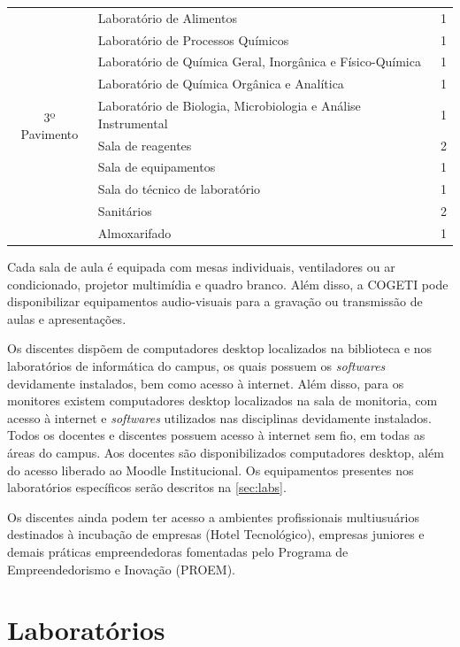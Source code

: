 \begin{table}
\begin{tabularx}{\textwidth}{c >{\centering\arraybackslash}X  c}
        \multirow{10}{*}{ 3º Pavimento } & Laboratório de Alimentos & 1 \\
        & Laboratório de Processos Químicos & 1 \\
        & Laboratório de Química Geral, Inorgânica e Físico-Química & 1 \\
        & Laboratório de Química Orgânica e Analítica & 1 \\
        & Laboratório de Biologia, Microbiologia e Análise Instrumental & 1 \\
        & Sala de reagentes & 2 \\
        & Sala de equipamentos & 1 \\
        & Sala do técnico de laboratório & 1 \\
        & Sanitários & 2 \\
        & Almoxarifado & 1 \\ \bottomrule

        \end{tabularx}
    \label{qua:blocoa}
\end{table}

Cada sala de aula é equipada com mesas individuais, ventiladores ou ar condicionado, projetor multimídia e quadro branco. Além disso, a COGETI pode disponibilizar equipamentos audio-visuais para a gravação ou transmissão de aulas e apresentações.

Os discentes dispõem de computadores desktop localizados na biblioteca e nos laboratórios de informática do campus, os quais possuem os \textit{softwares} devidamente instalados, bem como acesso à internet. Além disso, para os monitores existem computadores desktop localizados na sala de monitoria, com acesso à internet e \textit{softwares} utilizados nas disciplinas devidamente instalados. Todos os docentes e discentes possuem acesso à internet sem fio, em todas as áreas do campus. Aos docentes são disponibilizados computadores desktop, além do acesso liberado ao Moodle Institucional. Os equipamentos presentes nos laboratórios específicos serão descritos na \autoref{sec:labs}.

Os discentes ainda podem ter acesso a ambientes profissionais multiusuários destinados à incubação de empresas (Hotel Tecnológico), empresas juniores e demais práticas empreendedoras fomentadas pelo Programa de Empreendedorismo e Inovação (PROEM).

\section{Laboratórios}
\label{sec:labs}

